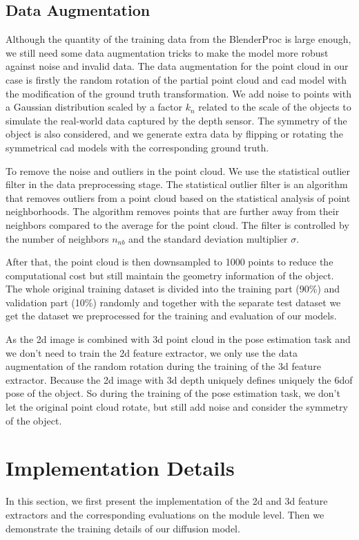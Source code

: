\documentclass[12pt,DIV14,BCOR12mm,a4paper,footinclude=false,headinclude,parskip=half-,twoside,openright,cleardoublepage=empty,toc=index,bibliography=totoc,listof=totoc]{scrreprt}
\numberwithin{equation}{chapter}
\begin{document}
\subsection{Data Augmentation}
Although the quantity of the training data from the BlenderProc is large enough, we still need some data augmentation tricks to make the model more robust against noise and invalid data. The data augmentation for the point cloud in our case is firstly the random rotation of the partial point cloud and \gls{cad} model with the modification of the ground truth transformation. We add noise to points with a Gaussian distribution scaled by a factor $k_{n}$ related to the scale of the objects to simulate the real-world data captured by the depth sensor. The symmetry of the object is also considered, and we generate extra data by flipping or rotating the symmetrical \gls{cad} models with the corresponding ground truth. 

To remove the noise and outliers in the point cloud. We use the statistical outlier filter in the data preprocessing stage. The statistical outlier filter is an algorithm that removes outliers from a point cloud based on the statistical analysis of point neighborhoods. The algorithm removes points that are further away from their neighbors compared to the average for the point cloud. The filter is controlled by the number of neighbors $n_{nb}$ and the standard deviation multiplier $\sigma$.

After that, the point cloud is then downsampled to 1000 points to reduce the computational cost but still maintain the geometry information of the object. The whole original training dataset is divided into the training part (90\%) and validation part (10\%) randomly and together with the separate test dataset we get the dataset we preprocessed for the training and evaluation of our models.

As the \gls{2d} image is combined with \gls{3d} point cloud in the pose estimation task and we don't need to train the \gls{2d} feature extractor, we only use the data augmentation of the random rotation during the training of the \gls{3d} feature extractor. Because the \gls{2d} image with \gls{3d} depth uniquely defines uniquely the \gls{6dof} pose of the object. So during the training of the pose estimation task, we don't let the original point cloud rotate, but still add noise and consider the symmetry of the object.
\section{Implementation Details}
In this section, we first present the implementation of the \gls{2d} and \gls{3d} feature extractors and the corresponding evaluations on the module level. Then we demonstrate the training details of our diffusion model.
\end{document}
